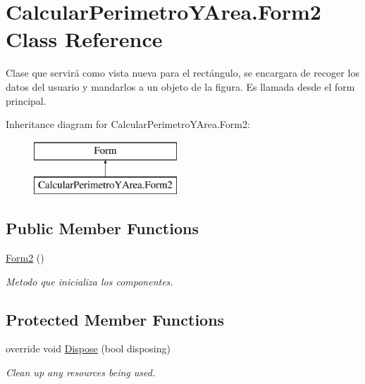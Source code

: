 \hypertarget{class_calcular_perimetro_y_area_1_1_form2}{}\section{Calcular\+Perimetro\+Y\+Area.\+Form2 Class Reference}
\label{class_calcular_perimetro_y_area_1_1_form2}


Clase que servirá como vista nueva para el rectángulo, se encargara de recoger los datos del usuario y mandarlos a un objeto de la figura. Es llamada desde el form principal.  


Inheritance diagram for Calcular\+Perimetro\+Y\+Area.\+Form2\+:\begin{figure}[H]
\begin{center}
\leavevmode
\includegraphics[height=2.000000cm]{class_calcular_perimetro_y_area_1_1_form2}
\end{center}
\end{figure}
\subsection*{Public Member Functions}
\begin{DoxyCompactItemize}
\item 
\hyperlink{class_calcular_perimetro_y_area_1_1_form2_af7f93de70f5e8e88bb24978e7a8839c4}{Form2} ()
\begin{DoxyCompactList}\small\item\em Metodo que inicializa los componentes. \end{DoxyCompactList}\end{DoxyCompactItemize}
\subsection*{Protected Member Functions}
\begin{DoxyCompactItemize}
\item 
override void \hyperlink{class_calcular_perimetro_y_area_1_1_form2_a8607aa1e56e361b157170961294bd971}{Dispose} (bool disposing)
\begin{DoxyCompactList}\small\item\em Clean up any resources being used. \end{DoxyCompactList}\end{DoxyCompactItemize}


